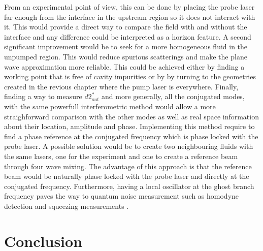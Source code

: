 From an experimental point of view, this can be done by placing the probe laser far enough from the interface in the upstream region so it does not interact with it. This would provide
a direct way to compare the field with and without the interface and any difference could be interpreted as a horizon feature. A second significant 
improvement would be to seek for a more homogeneous fluid in the unpumped region. This would reduce spurious scatterings and make the plane wave approximation more reliable.
This could be achieved either by finding a working point that is free of cavity impurities or by by turning to the geometries 
created in the revious chapter where the pump laser is everywhere.
Finally, finding a way to measure $d2_{out}^*$ and more generally, all the conjugated modes, with the same powerfull interferometric method would allow a more straighforward comparison with the other modes 
as well as real space information about their location, amplitude and phase. Implementing this method require to find a phase reference at the 
conjugated frequency which is phase locked with the probe laser. A possible solution would be to create two neighbouring fluids with the same lasers, one for the experiment and one to create
a reference beam through four wave mixing. The advantage of this approach is that the reference beam would be naturally phase locked with the probe laser and directly at the conjugated frequency.
Furthermore, having a local oscillator at the ghost branch frequency paves the way to quantum noise measurement such as homodyne detection and squeezing measurements \cite{agullo_symplectic_2022}.



\section{Conclusion}
\label{sec:conclusion}


